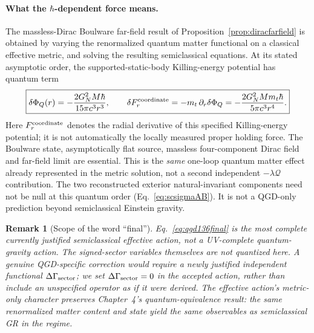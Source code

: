 \documentclass[11pt,a4paper]{article}
\newtheorem{remark}[theorem]{Remark}
\begin{document}
\paragraph{What the $\hbar$-dependent force means.}
The massless-Dirac Boulware far-field result of
Proposition~\ref{prop:diracfarfield} is obtained by varying the
renormalized quantum matter functional on a classical effective metric,
and solving the resulting semiclassical equations. At its stated
asymptotic order, the supported-static-body Killing-energy potential
has quantum term
\begin{equation}\label{eq:qgd136force}
\boxed{\delta\Phi_Q(r)=-\frac{2G_N^2M\hbar}{15\pi c^3r^3},\qquad
\delta F_r^{\rm coordinate}=-m_t\,\partial_r\delta\Phi_Q
=-\frac{2G_N^2Mm_t\hbar}{5\pi c^3r^4}.}
\end{equation}
Here $F_r^{\rm coordinate}$ denotes the radial derivative of this
specified Killing-energy potential; it is not automatically the
locally measured proper holding force. The Boulware state,
asymptotically flat source, massless four-component Dirac field and
far-field limit are essential. This is the \emph{same} one-loop quantum
matter effect already represented in the metric solution, not a
second independent $-\lambda\mathcal Q$ contribution. The two
reconstructed exterior natural-invariant components need not be
null at this quantum order (Eq.~\eqref{eq:scsigmaAB}). It is not
a QGD-only prediction beyond semiclassical Einstein gravity.

\begin{remark}[Scope of the word ``final'']
Eq.~\eqref{eq:qgd136final} is the most complete \emph{currently
justified semiclassical effective action}, not a UV-complete
quantum-gravity action. The signed-sector variables themselves are
not quantized here. A genuine QGD-specific correction would require
a newly justified independent functional $\Delta\Gamma_{\rm sector}$;
we set $\Delta\Gamma_{\rm sector}=0$ in the accepted action,
rather than include an unspecified operator as if it were derived.
The effective action's metric-only character preserves Chapter~4's
quantum-equivalence result: the same renormalized matter content and
state yield the same observables as semiclassical GR in the regime.
\end{remark}



\end{document}
